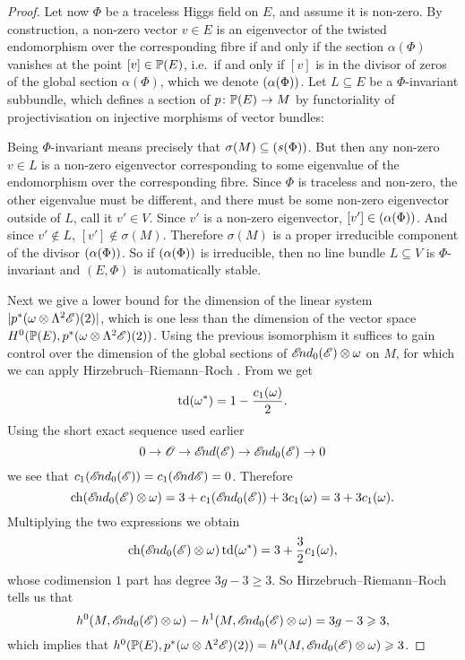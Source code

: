 \documentclass[A4paper, 12pt, british, reqno]{amsart}
\let\div\relax
\DeclareMathOperator{\div}{div}
\newcommand{\ot}{\otimes}
\newcommand{\dual}{^{*}}
\begin{document}
\begin{prop}
\begin{proof}
	Let now $\Phi$ be a traceless Higgs field on $E$, and assume it is non-zero.
	By construction, a non-zero vector $v\in E$ is an eigenvector of the twisted endomorphism over the corresponding fibre if and only if the section $\alpha(\Phi)$ vanishes at the point $[v]\in \P(E)$, i.e.~if and only if $[v]$ is in the divisor of zeros of the global section $\alpha(\Phi)$, which we denote $\div(\alpha(\Phi))$.
	Let $L\subseteq E$ be a $\Phi$-invariant subbundle, which defines a section of $p\colon \P(E)\to M$ by functoriality of projectivisation on injective morphisms of vector bundles:
	\begin{center}
	\end{center}
	Being $\Phi$-invariant means precisely that $\sigma(M)\subseteq \div(s(\Phi))$.
	But then any non-zero $v\in L$ is a non-zero eigenvector corresponding to some eigenvalue of the endomorphism over the corresponding fibre.
	Since $\Phi$ is traceless and non-zero, the other eigenvalue must be different, and there must be some non-zero eigenvector outside of $L$, call it $v'\in V$.
	Since $v'$ is a non-zero eigenvector, $[v']\in \div(\alpha(\Phi))$.
	And since $v'\not\in L$, $[v']\not\in \sigma(M)$.
	Therefore $\sigma(M)$ is a proper irreducible component of the divisor $\div(\alpha(\Phi))$.
	So if $\div(\alpha(\Phi))$ is irreducible, then no line bundle $L\subseteq V$ is $\Phi$-invariant and $(E,\Phi)$ is automatically stable.


	Next we give a lower bound for the dimension of the linear system $|p^{*}(\w\ot\Lambda^{2}\E)(2)|$, which is one less than the dimension of the vector space $H^{0}(\P(E),p^{*}(\w\ot\Lambda^{2}\E)(2))$.
	Using the previous isomorphism it suffices to gain control over the dimension of the global sections of $\sEnd_{0}(\E)\ot \w$ on $M$, for which we can apply Hirzebruch--Riemann--Roch \cite[Theorem A.4.1]{har77}.
	From \cite[Example A.4.1.1]{har77} we get
	\[ \operatorname{td}(\w\dual)=1-\frac{c_{1}(\w)}{2}. \]
	Using the short exact sequence used earlier
	\[ 0\to \O\to \sEnd(\E) \to \sEnd_{0}(\E)\to 0 \]
	we see that $c_{1}(\sEnd_{0}(\E))=c_{1}(\sEnd{\E})=0$.
	Therefore
	\[ \operatorname{ch}(\sEnd_{0}(\E)\ot \w)=3+c_{1}(\sEnd_{0}(\E))+3c_{1}(\w)=3+3c_{1}(\w). \]
	Multiplying the two expressions we obtain
	\[ \operatorname{ch}(\sEnd_{0}(\E)\ot \w)\operatorname{td}(\w\dual)=3+\frac{3}{2}c_{1}(\w), \]
	whose codimension $1$ part has degree $3g-3\geqslant 3$.
	So Hirzebruch--Riemann--Roch tells us that
	\[ h^{0}(M,\sEnd_{0}(\E)\ot \w)-h^{1}(M,\sEnd_{0}(\E)\ot \w)=3g-3\geqslant 3, \]
	which implies that $h^{0}(\P(E),p^{*}(\w\ot \Lambda^{2}\E)(2))=h^{0}(M,\sEnd_{0}(\E)\ot \w)\geqslant 3$.


\end{proof}
\end{prop}
\end{document}
